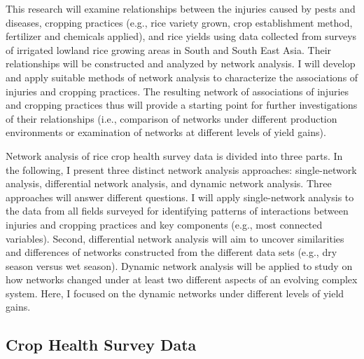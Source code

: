﻿%


This research will examine relationships between the injuries caused by pests and diseases, cropping practices (e.g., rice variety grown, crop establishment method, fertilizer and chemicals applied), and rice yields using data collected from surveys of irrigated lowland rice growing areas in South and South East Asia. Their relationships will be constructed and analyzed by network analysis. I will develop and apply suitable methods of network analysis to characterize the associations of injuries and cropping practices. The resulting network of associations of injuries and cropping practices thus will  provide a starting point for further investigations of their relationships (i.e., comparison of networks under different production environments or examination of networks at different levels of yield gains). 

Network analysis of rice crop health survey data is divided into three parts. In the following, I present three distinct network analysis approaches: single-network analysis, differential network analysis, and dynamic network analysis. Three approaches will answer different questions. I will apply single-network analysis to the data from all fields surveyed for identifying patterns of interactions between injuries and cropping practices and key components (e.g., most connected variables). Second, differential network analysis will aim to uncover similarities and differences of networks constructed from the different data sets (e.g., dry season versus wet season). Dynamic network analysis will be applied to study on how networks changed under at least two different aspects of an evolving complex system. Here, I focused on the dynamic networks under different levels of yield gains. 

\subsection*{Crop Health Survey Data}

